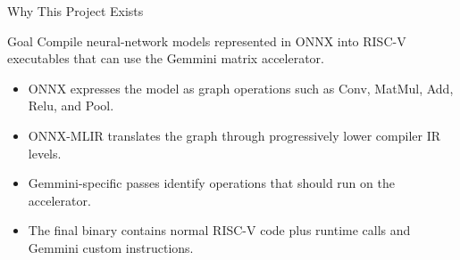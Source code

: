 \documentclass[aspectratio=169,10pt]{beamer}
\begin{document}
\begin{frame}{Why This Project Exists}
  \begin{block}{Goal}
    Compile neural-network models represented in ONNX into RISC-V executables that can use the Gemmini matrix accelerator.
  \end{block}
  \begin{itemize}
    \item ONNX expresses the model as graph operations such as Conv, MatMul, Add, Relu, and Pool.
    \item ONNX-MLIR translates the graph through progressively lower compiler IR levels.
    \item Gemmini-specific passes identify operations that should run on the accelerator.
    \item The final binary contains normal RISC-V code plus runtime calls and Gemmini custom instructions.
  \end{itemize}
\end{frame}
\end{document}
